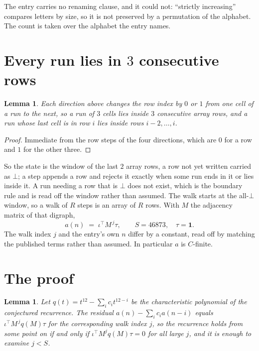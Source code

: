 \documentclass[11pt,a4paper]{article}
\theoremstyle{plain}
\newtheorem{lemma}[theorem]{Lemma}
\theoremstyle{definition}
\begin{document}
The entry carries no renaming clause, and it could not: ``strictly increasing'' compares
letters by size, so it is not preserved by a permutation of the alphabet. The count is taken
over the alphabet the entry names.

\section{Every run lies in $3$ consecutive rows}

\begin{lemma}\label{lem:win}
Each direction above changes the row index by $0$ or $1$ from one cell of a run to the next, so
a run of $3$ cells lies inside $3$ consecutive array rows, and a run whose last cell is in
row $i$ lies inside rows $i-2,\dots,i$.
\end{lemma}

\begin{proof}
Immediate from the row steps of the four directions, which are $0$ for a row and $1$ for the
other three.
\end{proof}

So the state is the window of the last $2$ array rows, a row not yet written carried as
$\bot$; a step appends a row and rejects it exactly when some run ends in it or lies inside it.
A run needing a row that is $\bot$ does not exist, which is the boundary rule and is read off
the window rather than assumed. The walk starts at the all-$\bot$ window, so a walk of $R$ steps
is an array of $R$ rows. With $M$ the adjacency matrix of that digraph,
\[
a(n)\;=\;\iota^{\!\top}M^{\,j}\tau ,\qquad S=46873,\quad\tau=\mathbf{1} .
\]
The walk index $j$ and the entry's own $n$ differ by a constant, read off by matching the
published terms rather than assumed. In particular $a$ is $C$-finite.

\section{The proof}

\begin{lemma}\label{lem:crit}
Let $q(t)=t^{12}-\sum_i c_it^{12-i}$ be the characteristic polynomial of the
conjectured recurrence. The residual $a(n)-\sum_ic_ia(n-i)$ equals
$\iota^{\!\top}M^{\,j}q(M)\tau$ for the corresponding walk index $j$, so the recurrence
holds from some point on if and only if $\iota^{\!\top}M^{j}q(M)\tau=0$ for all large $j$,
and it is enough to examine $j<S$.
\end{lemma}
\end{document}
